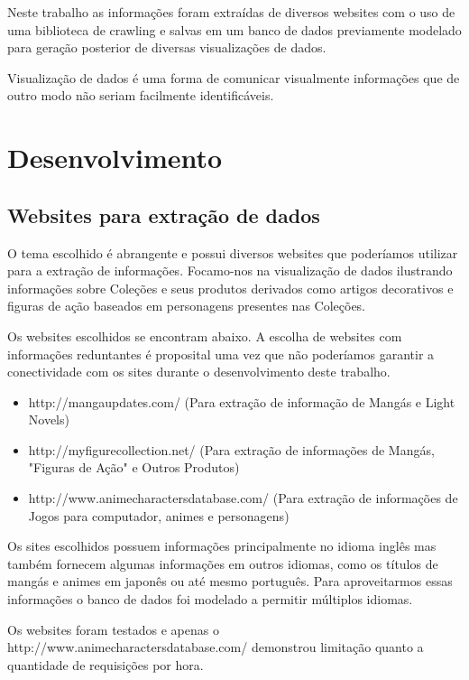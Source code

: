 \documentclass[12pt]{article}
\begin{document}
Neste trabalho as informações foram extraídas de diversos websites com o uso de uma biblioteca de crawling e salvas em um banco de dados previamente modelado para geração posterior de diversas visualizações de dados. 

Visualização de dados é uma forma de comunicar visualmente informações que de outro modo não seriam facilmente identificáveis.


\section{Desenvolvimento}

\subsection{Websites para extração de dados}

O tema escolhido é abrangente e possui diversos websites que poderíamos utilizar para a extração de informações. Focamo-nos na visualização de dados ilustrando informações sobre Coleções e seus produtos derivados como artigos decorativos e figuras de ação baseados em personagens presentes nas Coleções. 

Os websites escolhidos se encontram abaixo. A escolha de websites com informações reduntantes é proposital uma vez que não poderíamos garantir a conectividade com os sites durante o desenvolvimento deste trabalho. 

\begin{itemize}
\item http://mangaupdates.com/ (Para extração de informação de Mangás e Light Novels)
\item http://myfigurecollection.net/ (Para extração de informações de Mangás, "Figuras de Ação" e Outros Produtos)
\item http://www.animecharactersdatabase.com/ (Para extração de informações de Jogos para computador, animes e personagens)
\end{itemize}

Os sites escolhidos possuem informações principalmente no idioma inglês mas também fornecem algumas informações em outros idiomas, como os títulos de mangás e animes em japonês ou até mesmo português. Para aproveitarmos essas informações o banco de dados foi modelado a permitir múltiplos idiomas. 

Os websites foram testados e apenas o http://www.animecharactersdatabase.com/ demonstrou limitação quanto a quantidade de requisições por hora.
\end{document}
